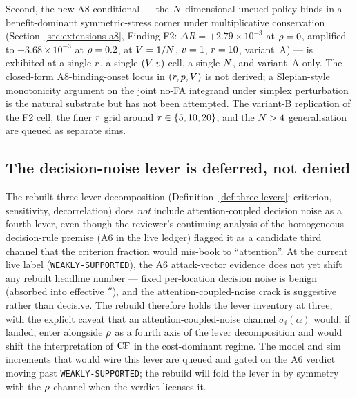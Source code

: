 Second, the new A8 conditional — the $N$-dimensional uncued
policy binds in a benefit-dominant symmetric-stress corner under
multiplicative conservation
(Section~\ref{sec:extensions-a8}, Finding F2: $\Delta R = +2.79\times
10^{-3}$ at $\rho = 0$, amplified to $+3.68\times 10^{-3}$ at
$\rho = 0.2$, at $V = 1/N$, $v = 1$, $r = 10$,
variant~A) — is exhibited at a single $r$, a single $(V,
v)$ cell, a single $N$, and variant~A only.  The closed-form
A8-binding-onset locus in $(r, p, V)$ is not derived; a
Slepian-style monotonicity argument on the joint no-FA integrand
under simplex perturbation is the natural substrate but has not been
attempted.  The variant-B replication of the F2 cell, the finer
$r$ grid around $r \in \{5, 10, 20\}$, and the
$N > 4$ generalisation are queued as separate sims.

\subsection{The decision-noise lever is deferred, not denied}
\label{sec:limitations-a6}

The rebuilt three-lever decomposition
(Definition~\ref{def:three-levers}: criterion, sensitivity,
decorrelation) does \emph{not} include attention-coupled decision
noise as a fourth lever, even though the reviewer's continuing
analysis of the homogeneous-decision-rule premise (A6 in the live
ledger) flagged it as a candidate third channel that the criterion
fraction would mis-book to ``attention''.  At the current live label
(\texttt{WEAKLY-SUPPORTED}), the A6 attack-vector evidence does not
yet shift any rebuilt headline number — fixed per-location decision
noise is benign (absorbed into effective $\dprime$), and the
attention-coupled-noise crack is suggestive rather than decisive.
The rebuild therefore holds the lever inventory at three, with the
explicit caveat that an attention-coupled-noise channel
$\sigma_i(\alpha)$ would, if landed, enter alongside $\rho$ as a
fourth axis of the lever decomposition and would shift the
interpretation of $\mathrm{CF}$ in the cost-dominant regime.  The model and
sim increments that would wire this lever are queued and gated on
the A6 verdict moving past \texttt{WEAKLY-SUPPORTED}; the rebuild
will fold the lever in by symmetry with the $\rho$ channel when
the verdict licenses it.

